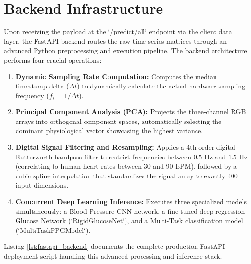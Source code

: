 \section{Backend Infrastructure}
Upon receiving the payload at the `/predict/all` endpoint via the client data layer, the FastAPI backend routes the raw time-series matrices through an advanced Python preprocessing and execution pipeline. The backend architecture performs four crucial operations:
\begin{enumerate}
    \item \textbf{Dynamic Sampling Rate Computation:} Computes the median timestamp delta ($\Delta t$) to dynamically calculate the actual hardware sampling frequency ($f_s = 1 / \Delta t$).
    \item \textbf{Principal Component Analysis (PCA):} Projects the three-channel RGB arrays into orthogonal component spaces, automatically selecting the dominant physiological vector showcasing the highest variance.
    \item \textbf{Digital Signal Filtering and Resampling:} Applies a 4th-order digital Butterworth bandpass filter to restrict frequencies between $0.5\text{ Hz}$ and $1.5\text{ Hz}$ (correlating to human heart rates between 30 and 90 BPM), followed by a cubic spline interpolation that standardizes the signal array to exactly $400$ input dimensions.
    \item \textbf{Concurrent Deep Learning Inference:} Executes three specialized models simultaneously: a Blood Pressure CNN network, a fine-tuned deep regression Glucose Network (`RigidGlucoseNet`), and a Multi-Task classification model (`MultiTaskPPGModel`).
\end{enumerate}

Listing \ref{lst:fastapi_backend} documents the complete production FastAPI deployment script handling this advanced processing and inference stack.


